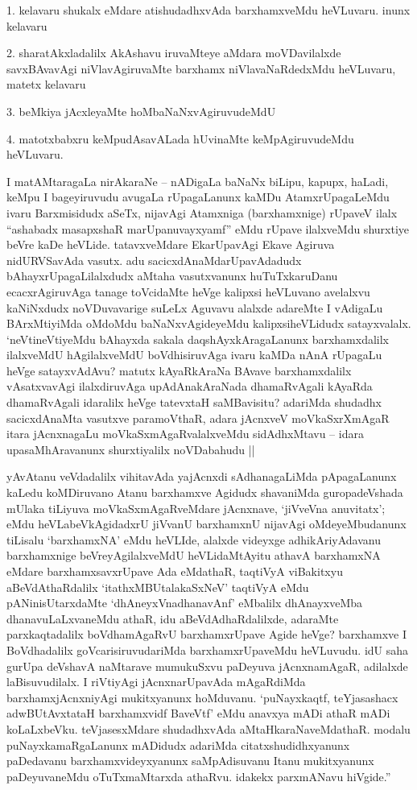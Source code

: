 \begin{artha}
1. kelavaru shukalx eMdare atishudadhxvAda barxhamxveMdu heVLuvaru. inunx kelavaru

2. sharatAkxladalilx AkAshavu iruvaMteye aMdara moVDavilalxde savxBAvavAgi niVlavAgiruvaMte barxhamx niVlavaNaRdedxMdu heVLuvaru, matetx kelavaru 

3. beMkiya jAcxleyaMte hoMbaNaNxvAgiruvudeMdU

4. matotxbabxru keMpudAsavALada hUvinaMte keMpAgiruvudeMdu heVLuvaru.

I matAMtaragaLa nirAkaraNe -- nADigaLa baNaNx biLipu, kapupx, haLadi, keMpu I bageyiruvudu avugaLa rUpagaLanunx kaMDu AtamxrUpagaLeMdu ivaru Barxmisidudx aSeTx, nijavAgi Atamxniga (barxhamxnige) rUpaveV ilalx ``ashabadx masapxshaR marUpanuvayxyamf'' eMdu rUpave ilalxveMdu shurxtiye beVre kaDe heVLide. tatavxveMdare EkarUpavAgi Ekave Agiruva nidURVSavAda vasutx. adu sacicxdAnaMdarUpavAdadudx bAhayxrUpagaLilalxdudx aMtaha vasutxvanunx huTuTxkaruDanu ecacxrAgiruvAga tanage toVcidaMte heVge kalipxsi heVLuvano avelalxvu kaNiNxdudx noVDuvavarige suLeLx Aguvavu alalxde adareMte I vAdigaLu BArxMtiyiMda oMdoMdu baNaNxvAgideyeMdu kalipxsiheVLidudx satayxvalalx. `neVtineVtiyeMdu bAhayxda sakala daqshAyxkAragaLanunx barxhamxdalilx ilalxveMdU hAgilalxveMdU boVdhisiruvAga ivaru kaMDa nAnA rUpagaLu heVge satayxvAdAvu? matutx kAyaRkAraNa BAvave barxhamxdalilx vAsatxvavAgi ilalxdiruvAga upAdAnakAraNada dhamaRvAgali kAyaRda dhamaRvAgali idaralilx heVge tatevxtaH saMBavisitu? adariMda shudadhx sacicxdAnaMta vasutxve paramoVthaR, adara jAcnxveV moVkaSxrXmAgaR itara jAcnxnagaLu moVkaSxmAgaRvalalxveMdu sidAdhxMtavu -- idara upasaMhAravanunx shurxtiyalilx noVDabahudu ||
\end{artha}

\begin{artha}
yAvAtanu veVdadalilx vihitavAda yajAcnxdi sAdhanagaLiMda pApagaLanunx kaLedu koMDiruvano Atanu barxhamxve Agidudx shavaniMda guropadeVshada mUlaka tiLiyuva moVkaSxmAgaRveMdare jAcnxnave, `jiVveVna anuvitatx'; eMdu heVLabeVkAgidadxrU jiVvanU barxhamxnU nijavAgi oMdeyeMbudanunx tiLisalu `barxhamxNA' eMdu heVLIde, alalxde videyxge adhikAriyAdavanu barxhamxnige beVreyAgilalxveMdU heVLidaMtAyitu athavA barxhamxNA eMdare barxhamxsavxrUpave Ada eMdathaR, taqtiVyA viBakitxyu aBeVdAthaRdalilx `itathxMBUtalakaSxNeV' taqtiVyA eMdu pANinisUtarxdaMte `dhAneyxVnadhanavAnf' eMbalilx dhAnayxveMba dhanavuLaLxvaneMdu athaR, idu aBeVdAdhaRdalilxde, adaraMte parxkaqtadalilx boVdhamAgaRvU barxhamxrUpave Agide heVge? barxhamxve I BoVdhadalilx goVcarisiruvudariMda barxhamxrUpaveMdu heVLuvudu. idU saha gurUpa deVshavA naMtarave mumukuSxvu paDeyuva jAcnxnamAgaR, adilalxde laBisuvudilalx. I riVtiyAgi jAcnxnarUpavAda mAgaRdiMda barxhamxjAcnxniyAgi mukitxyanunx hoMduvanu. `puNayxkaqtf, teYjasashacx adwBUtAvxtataH barxhamxvidf BaveVtf' eMdu anavxya mADi athaR mADi koLaLxbeVku. teVjasesxMdare shudadhxvAda aMtaHkaraNaveMdathaR. modalu puNayxkamaRgaLanunx mADidudx adariMda citatxshudidhxyanunx paDedavanu barxhamxvideyxyanunx saMpAdisuvanu Itanu mukitxyanunx paDeyuvaneMdu oTuTxmaMtarxda athaRvu. idakekx parxmANavu hiVgide.''
\end{artha}

